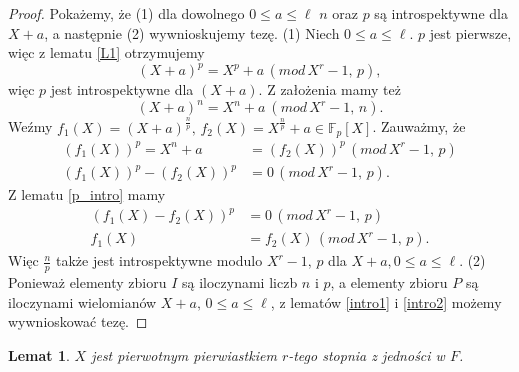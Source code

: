 \documentclass[declaration,shortabstract]{iithesis}
\theoremstyle{definition}
\theoremstyle{remark} \newtheorem{observation}{Obserwacja}
\theoremstyle{plain} \newtheorem{theorem}{Twierdzenie}
\theoremstyle{plain} \newtheorem{lemma}{Lemat}
\theoremstyle{remark} \newtheorem*{remark*}{Uwaga}
\theoremstyle{reminder} \newtheorem*{reminder*}{Przypomnienie}
\begin{document}
\begin{proof}
	Pokażemy, że (1) dla dowolnego $0 \leq a \leq \ell$ $n$ oraz $p$ są introspektywne dla $X + a$, a następnie (2) wywnioskujemy tezę. \newline
	(1) Niech $0 \leq a \leq \ell$. $p$ jest pierwsze, więc z lematu \ref{L1} otrzymujemy \[(X + a)^p = X^p + a \, (mod \, X^r - 1, \, p),\] więc $p$ jest introspektywne dla $(X + a)$. Z założenia mamy też  \[(X + a)^n = X^n + a \: (mod \, X^r - 1, \, n).\] Weźmy $f_1(X) = (X + a)^{\frac{n}{p}}, \, f_2(X) = X^{\frac{n}{p}} + a \in \mathbb{F}_p[X]$. Zauważmy, że 
	\begin{align*}
		(f_1(X))^p = X^n + a    & = (f_2(X))^p \, (mod \, X^r - 1, \, p) \\
		(f_1(X))^p - (f_2(X))^p & = 0 \, (mod \, X^r - 1, \, p).         
	\end{align*}
	Z lematu \ref{p_intro} mamy
	\begin{align*}
		(f_1(X) - f_2(X))^p & = 0 \, (mod \, X^r - 1, \, p)       \\
		f_1(X)              & = f_2(X) \, (mod \, X^r - 1, \, p). 
	\end{align*}
	Więc $\frac{n}{p}$ także jest introspektywne modulo $X^r - 1, \, p$ dla $X + a, 0 \leq a \leq \ell$.
	\newline(2) Ponieważ elementy zbioru $I$ są iloczynami liczb $n$ i $p$, a elementy zbioru $P$ są iloczynami wielomianów $X + a, \, 0 \leq a \leq \ell$, z lematów \ref{intro1} i \ref{intro2} możemy wywnioskować tezę.
\end{proof} 

\begin{lemma}\label{X_pierw}
	$X$ jest pierwotnym pierwiastkiem $r$-tego stopnia z jedności w $F$.
\end{lemma}
	
\end{document}
